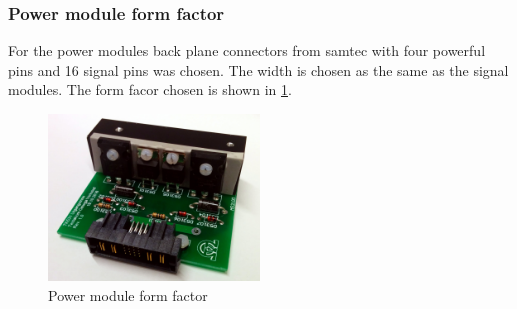 \subsubsection{Power module form factor}
For the power modules back plane connectors from samtec with four powerful pins and 16 signal pins was chosen. The width is chosen as the same as the signal modules.
The form facor chosen is shown in \cref{fig:TK531}.
\begin{figure}
    \centering
    \includegraphics[width=0.5\textwidth]{img/TK531_IMG.jpg}
    \caption{Power module form factor}
    \label{fig:TK531}
\end{figure}